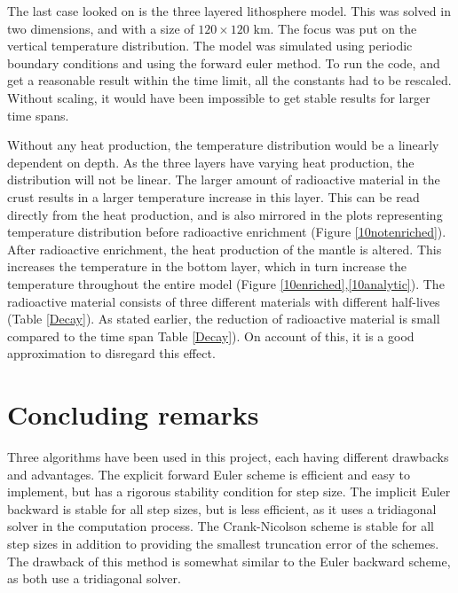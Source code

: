 \documentclass[10pt,a4paper]{article}
\begin{document}
\noindent The last case looked on is the three layered lithosphere model. This was solved in two dimensions, and with a size of $120 \times 120$ km. The focus was put on the vertical temperature distribution. The model was simulated using periodic boundary conditions and using the forward euler method. To run the code, and get a reasonable result within the time limit, all the constants had to be rescaled. Without scaling, it would have been impossible to get stable results for larger time spans.   



\noindent Without any heat production, the temperature distribution would be a linearly dependent on depth. As the three layers have varying heat production, the distribution will not be linear. The larger amount of radioactive material in the crust results in a larger temperature increase in this layer. This can be read directly from the heat production, and is also mirrored in the plots representing temperature distribution before radioactive enrichment (Figure \ref{10notenriched}).\\ 


\noindent After radioactive enrichment, the heat production of the mantle is altered. This increases the temperature in the bottom layer, which in turn increase the temperature throughout the entire model (Figure \ref{10enriched},\ref{10analytic}). The radioactive material consists of three different materials with different half-lives (Table \ref{Decay}). As stated earlier, the reduction of radioactive material is small compared to the time span Table \ref{Decay}). On account of this, it is a good approximation to disregard this effect.  



\newpage
\section*{Concluding remarks}
Three algorithms have been used in this project, each having different drawbacks and advantages. The explicit forward Euler scheme is efficient and easy to implement, but has a rigorous stability condition for step size. The implicit Euler backward is stable for all step sizes, but is less efficient, as it uses a tridiagonal solver in the computation process. The Crank-Nicolson scheme is stable for all step sizes in addition to providing the smallest truncation error of the schemes. The drawback of this method is somewhat similar to the Euler backward scheme, as both use a tridiagonal solver.\\ 
\end{document}
